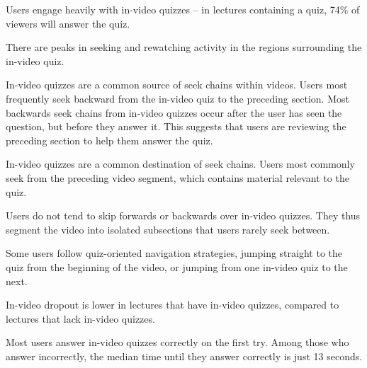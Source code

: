 \documentclass{sigchi}
\begin{document}
\begin{compactitem}
\item Users engage heavily with in-video quizzes -- in lectures containing a quiz, 74\% of viewers will answer the quiz.
\item There are peaks in seeking and rewatching activity in the regions surrounding the in-video quiz. %
\item In-video quizzes are a common source of seek chains within videos. Users most frequently seek backward from the in-video quiz to the preceding section. Most backwards seek chains from in-video quizzes occur after the user has seen the question, but before they answer it. This suggests that users are reviewing the preceding section to help them answer the quiz. %
\item In-video quizzes are a common destination of seek chains. Users most commonly seek from the preceding video segment, which contains material relevant to the quiz.
\item Users do not tend to skip forwards or backwards over in-video quizzes. They thus segment the video into isolated subsections that users rarely seek between.
\item Some users follow quiz-oriented navigation strategies, jumping straight to the quiz from the beginning of the video, or jumping from one in-video quiz to the next.
\item In-video dropout is lower in lectures that have in-video quizzes, compared to lectures that lack in-video quizzes.
\item Most users answer in-video quizzes correctly on the first try. Among those who answer incorrectly, the median time until they answer correctly is just 13 seconds.
\end{compactitem}
\end{document}
